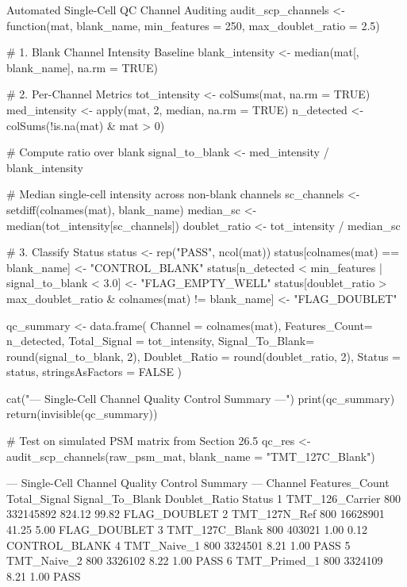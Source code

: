 \documentclass[11pt,twoside,openright]{book}
\begin{document}
\begin{rchunk}{Automated Single-Cell QC Channel Auditing}
audit_scp_channels <- function(mat, blank_name, min_features = 250, max_doublet_ratio = 2.5) {
  # 1. Blank Channel Intensity Baseline
  blank_intensity <- median(mat[, blank_name], na.rm = TRUE)
  
  # 2. Per-Channel Metrics
  tot_intensity <- colSums(mat, na.rm = TRUE)
  med_intensity <- apply(mat, 2, median, na.rm = TRUE)
  n_detected    <- colSums(!is.na(mat) & mat > 0)
  
  # Compute ratio over blank
  signal_to_blank <- med_intensity / blank_intensity
  
  # Median single-cell intensity across non-blank channels
  sc_channels <- setdiff(colnames(mat), blank_name)
  median_sc   <- median(tot_intensity[sc_channels])
  doublet_ratio <- tot_intensity / median_sc
  
  # 3. Classify Status
  status <- rep("PASS", ncol(mat))
  status[colnames(mat) == blank_name] <- "CONTROL_BLANK"
  status[n_detected < min_features | signal_to_blank < 3.0] <- "FLAG_EMPTY_WELL"
  status[doublet_ratio > max_doublet_ratio & colnames(mat) != blank_name] <- "FLAG_DOUBLET"
  
  qc_summary <- data.frame(
    Channel       = colnames(mat),
    Features_Count= n_detected,
    Total_Signal  = tot_intensity,
    Signal_To_Blank= round(signal_to_blank, 2),
    Doublet_Ratio = round(doublet_ratio, 2),
    Status        = status,
    stringsAsFactors = FALSE
  )
  
  cat("--- Single-Cell Channel Quality Control Summary ---\n")
  print(qc_summary)
  return(invisible(qc_summary))
}

# Test on simulated PSM matrix from Section 26.5
qc_res <- audit_scp_channels(raw_psm_mat, blank_name = "TMT_127C_Blank")
\end{rchunk}

\begin{routput}
--- Single-Cell Channel Quality Control Summary ---
           Channel Features\_Count Total\_Signal Signal\_To\_Blank Doublet\_Ratio            Status
1  TMT\_126\_Carrier            800    332145892          824.12         99.82      FLAG\_DOUBLET
2     TMT\_127N\_Ref            800     16628901           41.25          5.00      FLAG\_DOUBLET
3   TMT\_127C\_Blank            800       403021            1.00          0.12     CONTROL\_BLANK
4      TMT\_Naive\_1            800      3324501            8.21          1.00              PASS
5      TMT\_Naive\_2            800      3326102            8.22          1.00              PASS
6     TMT\_Primed\_1            800      3324109            8.21          1.00              PASS
\end{routput}
\end{document}
